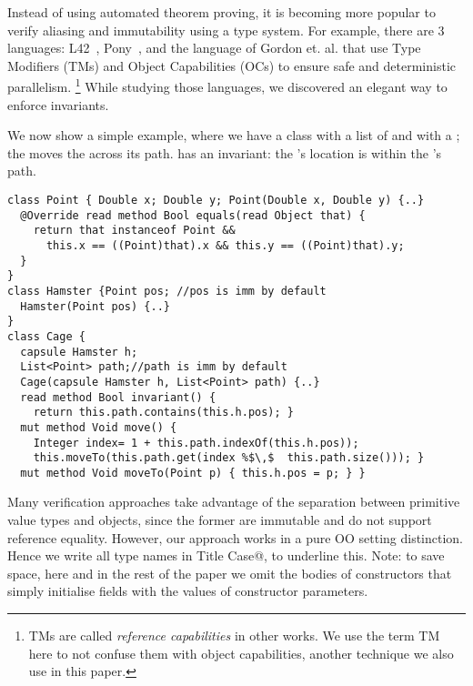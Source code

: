 Instead of using automated theorem proving, 
it is becoming more popular to verify aliasing and immutability using a type system.
For example, there are 3 languages: L42~\cite{ServettoZucca15,ServettoEtAl13a,JOT:issue_2011_01/article1,GianniniEtAl16}, Pony~\cite{clebsch2015deny,clebsch2017orca}, and the language of Gordon et. al.\cite{GordonEtAl12} that use Type Modifiers (TMs) and Object Capabilities (OCs) to ensure safe and deterministic parallelism.%
\footnote{TMs are called \emph{reference capabilities} in other works. We use the term TM here
to not confuse them with object capabilities, another technique we also use in this paper.}
While studying those languages, we discovered an elegant way to enforce invariants.


We now show a simple example, where we have a \Q@Cage@ class with a list of \Q@Point@s \Q@path@ and \Q@Hamster@ with a \Q@Point@ \Q@pos@; the \Q@Cage@ moves the \Q@Hamster@ across its path. \Q@Cage@ has an invariant: the \Q@Hamster@'s location is within the \Q@Cage@'s path.


\begin{lstlisting}
class Point { Double x; Double y; Point(Double x, Double y) {..}
  @Override read method Bool equals(read Object that) {
    return that instanceof Point &&
      this.x == ((Point)that).x && this.y == ((Point)that).y;
  } 
}
class Hamster {Point pos; //pos is imm by default
  Hamster(Point pos) {..} 
}
class Cage {
  capsule Hamster h;
  List<Point> path;//path is imm by default
  Cage(capsule Hamster h, List<Point> path) {..}
  read method Bool invariant() {
    return this.path.contains(this.h.pos); }
  mut method Void move() {
    Integer index= 1 + this.path.indexOf(this.h.pos));
    this.moveTo(this.path.get(index %$\,$  this.path.size())); }
  mut method Void moveTo(Point p) { this.h.pos = p; } }
\end{lstlisting}
Many verification approaches take advantage of the separation between primitive value types and objects, since the former are immutable and do not support reference equality.
However, our approach works in a pure OO setting distinction. Hence we write all type names in \Q@Bold Title Case@, to underline this. Note: to save space, here and in the rest of the paper we omit the bodies of constructors that simply initialise fields with the values of constructor parameters.

